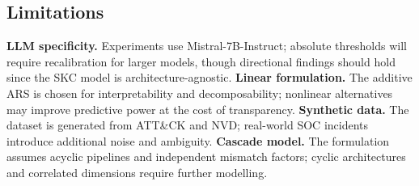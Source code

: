 \subsection{Limitations}

\textbf{LLM specificity.} Experiments use Mistral-7B-Instruct; absolute
thresholds will require recalibration for larger models, though directional
findings should hold since the SKC model is architecture-agnostic.
\textbf{Linear formulation.} The additive ARS is chosen for
interpretability and decomposability; nonlinear alternatives may improve
predictive power at the cost of transparency.
\textbf{Synthetic data.} The dataset is generated from ATT\&CK and NVD;
real-world SOC incidents introduce additional noise and ambiguity.
\textbf{Cascade model.} The formulation assumes acyclic pipelines and
independent mismatch factors; cyclic architectures and correlated
dimensions require further modelling.
